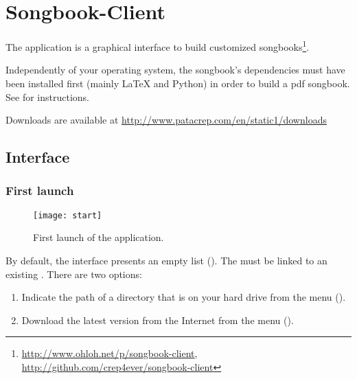 \chapter{Songbook-Client}
\setcounter{chapter}{2}
\label{chap:songbook-client}
\minitoc

The \client{} application is a graphical interface to build customized
songbooks\footnote{\url{http://www.ohloh.net/p/songbook-client},
  \url{http://github.com/crep4ever/songbook-client}}.

\begin{nota}
Independently of your operating system, the songbook's dependencies must
have been installed first (mainly \LaTeX{} and Python) in order to
build a pdf songbook. See  for instructions.
\end{nota}

Downloads are available at \url{http://www.patacrep.com/en/static1/downloads}


\section{Interface}

\subsection{First launch}

\begin{figure}
  \centering
  \texttt{[image: start]}
  \caption{First launch of the application.}
  \label{fig:start}
\end{figure}

By default, the interface presents an empty list
(). The \client{} must be linked to an existing
\recueil{}. There are two options:

\begin{enumerate}
\item Indicate the path of a  directory that is on
  your hard drive from the menu 
  ().
\item Download the latest version from the Internet from the menu
   ().
\end{enumerate}

